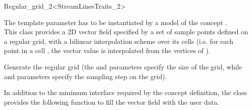 

\begin{ccRefClass}{Regular_grid_2<StreamLinesTraits_2>}  %

\ccDefinition
  
The template parameter  has to be
instantiated by a model of the concept .\\
This class provides a 2D vector field specified by a set of sample
points defined on a regular grid, with a bilinear interpolation scheme
over its cells (i.e. for each point  in a cell , the
vector value is interpolated from the vertices of ).

\ccCreation
{}  %

\ccThreeToTwo

\ccThreeToTwo
{}
{Generate the regular grid \ccVar (the  and 
parameters specify the size of the grid, while  and
 parameters specify the sampling step on the grid).}


In addition to the minimum interface required by the concept
definition, the class \ccRefName provides the following function to
fill the vector field with the user data.




\ccIsModel 

 \\

\ccSeeAlso
{} \\
\end{ccRefClass}


